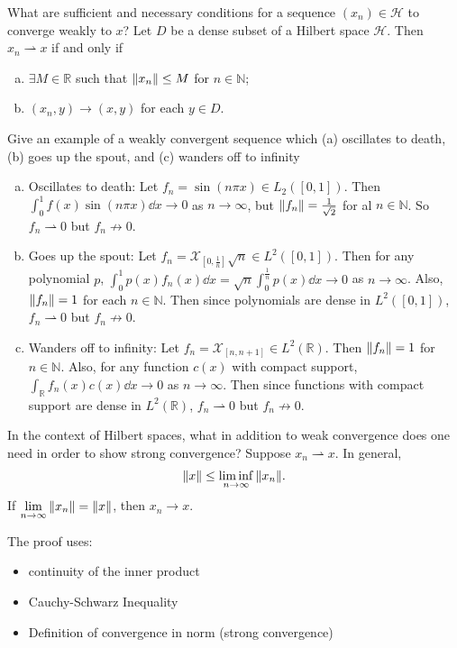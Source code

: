 \documentclass[avery5388,grid,frame]{flashcards}
\def\Rl{\mathbb{R}}
\def\hilb{\mathcal{H}}
\begin{document}
\begin{flashcard}
    {What are sufficient and necessary conditions for a sequence $(x_n) \in \hilb$ to converge weakly to $x$?}
    Let $D$ be a dense subset of a Hilbert space $\hilb$.  Then $x_n \rightharpoonup x$ if and only if
    \begin{enumerate}[(a)]
        \item $\exists M \in \Rl$ such that $\norm{x_n} \leq M$ for $n \in \mathbb{N}$;
        \item $(x_n, y) \rightarrow (x,y)$ for each $y \in D$.
    \end{enumerate}
\end{flashcard}

\begin{flashcard}
    {Give an example of a weakly convergent sequence which (a) oscillates to death, (b) goes up the spout, and (c) wanders off to infinity}
    \begin{enumerate}[(a)]
        \item Oscillates to death: Let $f_n = \sin(n\pi x) \in L_2([0,1])$.  Then $\int_0^1 f(x) \sin(n\pi x) \dd x \rightarrow 0$ as $n \rightarrow \infty$, but $\norm{f_n} = \frac{1}{\sqrt{2}}$ for al $n \in \mathbb{N}$.  So $f_n \rightharpoonup 0$ but $f_n \not\rightarrow 0$.
        \item Goes up the spout: Let $f_n = \mathcal{X}_{[0, \frac{1}{n}]}\sqrt{n} \in L^2([0,1])$.  Then for any polynomial $p$, $\int_0^1 p(x)f_n(x)\dd x = \sqrt{n}\int_0^\frac{1}{n} p(x) \dd x \rightarrow 0$ as $n \rightarrow \infty$.  Also, $\norm{f_n} = 1$ for each $n \in \mathbb{N}$.  Then since polynomials are dense in $L^2([0,1])$, $f_n \rightharpoonup 0$ but $f_n \not\rightarrow 0$.
        \item Wanders off to infinity: Let $f_n = \mathcal{X}_{[n, n+1]} \in L^2(\Rl)$.  Then $\norm{f_n} = 1$ for $n \in \mathbb{N}$.  Also, for any function $c(x)$ with compact support, $\int_\Rl f_n(x)c(x) \dd x \rightarrow 0$ as $n \rightarrow \infty$.  Then since functions with compact support are dense in $L^2(\Rl)$, $f_n \rightharpoonup 0$ but $f_n \not\rightarrow 0$.
    \end{enumerate}
\end{flashcard}

\begin{flashcard}
    {In the context of Hilbert spaces, what in addition to weak convergence does one need in order to show strong convergence?}
    Suppose $x_n \rightharpoonup x$.  In general,
    \begin{align*}
        \norm{x} \leq \liminf_{n\rightarrow \infty}\norm{x_n}.
    \end{align*}
    If $\displaystyle\lim_{n\rightarrow \infty} \norm{x_n} = \norm{x}$, then $x_n \rightarrow x$.

    The proof uses:
    \begin{itemize}
        \item continuity of the inner product
        \item Cauchy-Schwarz Inequality
        \item Definition of convergence in norm (strong convergence)
    \end{itemize}
\end{flashcard}
\end{document}
